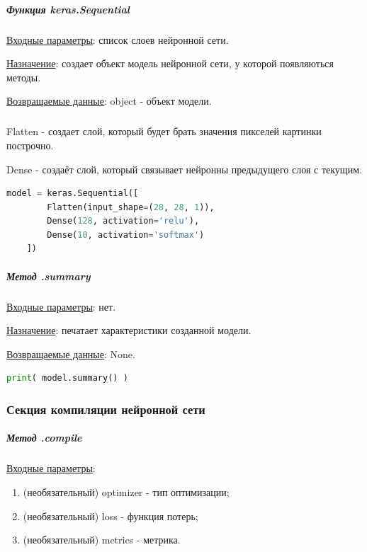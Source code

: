 \subparagraph{Функция keras.Sequential} \hspace{0pt}

\underline{Входные параметры}: список слоев нейронной сети.

\underline{Назначение}: создает объект модель нейронной сети, у которой появляються методы.

\underline{Возвращаемые данные}: object - объект модели.

\subparagraph{} \hspace{0pt}

Flatten - создает слой, который будет брать значения пикселей картинки построчно.

Dense - создаёт слой, который связывает нейронны предыдущего слоя с текущим.

\begin{lstlisting}[language=Python,]
    model = keras.Sequential([
        Flatten(input_shape=(28, 28, 1)),
        Dense(128, activation='relu'),
        Dense(10, activation='softmax')
    ])
\end{lstlisting}

\subparagraph{Метод .summary} \hspace{0pt}

\underline{Входные параметры}: нет.

\underline{Назначение}: печатает характеристики созданной модели.

\underline{Возвращаемые данные}: None.


\begin{lstlisting}[language=Python,]
    print( model.summary() )
\end{lstlisting}



\subsubsection*{Секция компиляции нейронной сети}

\subparagraph{Метод .compile} \hspace{0pt}

\underline{Входные параметры}:
\begin{enumerate}
    \item (необязательный) optimizer - тип оптимизации;
    \item (необязательный) loss - функция потерь;
    \item (необязательный) metrics - метрика.
\end{enumerate}

